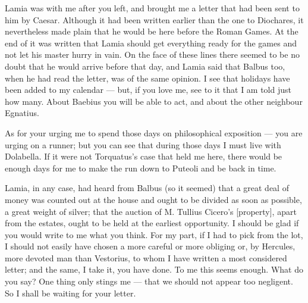 

 Lamia was with me after you left, and brought me a letter that had been sent to him by Caesar. Although it had been written earlier than the one to Diochares, it nevertheless made plain that he would be here before the Roman Games. At the end of it was written that Lamia should get everything ready for the games and not let his master hurry in vain. On the face of these lines there seemed to be no doubt that he would arrive before that day, and Lamia said that Balbus too, when he had read the letter, was of the same opinion. I see that holidays have been added to my calendar --- but, if you love me, see to it that I am told just how many. About Baebius you will be able to act, and about the other neighbour Egnatius.

 As for your urging me to spend those days on philosophical exposition --- you are urging on a runner; but you can see that during those days I must live with Dolabella. If it were not Torquatus's case that held me here, there would be enough days for me to make the run down to Puteoli and be back in time.

 Lamia, in any case, had heard from Balbus (so it seemed) that a great deal of money was counted out at the house and ought to be divided as soon as possible, a great weight of silver; that the auction of M. Tullius Cicero's [property], apart from the estates, ought to be held at the earliest opportunity. I should be glad if you would write to me what you think. For my part, if I had to pick from the lot, I should not easily have chosen a more careful or more obliging or, by Hercules, more devoted man than Vestorius, to whom I have written a most considered letter; and the same, I take it, you have done. To me this seems enough. What do you say? One thing only stings me --- that we should not appear too negligent. So I shall be waiting for your letter.
